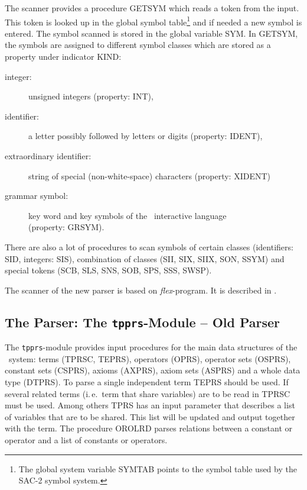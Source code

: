 The \redux scanner provides a procedure GETSYM which reads a token from
the input.
This token is looked up in the global symbol table\footnote{The global
system variable SYMTAB points to the symbol table used by the SAC-2 symbol 
system.} %
and if needed a new symbol is entered.
The symbol scanned is stored in the global variable SYM.
In GETSYM, the symbols are assigned to different symbol classes which 
are stored as a property under indicator KIND:
\begin{description}
 \item[integer:] unsigned integers (property: INT),
 \item[identifier:] a letter possibly followed by letters or digits
                    (property: IDENT),
 \item[extraordinary identifier:] string of special (non-white-space) 
                    characters (property: XIDENT)
 \item[grammar symbol:] key word and key symbols of the \redux\ interactive
                    language \\ (property: GRSYM).
\end{description}
There are also a lot of procedures to scan symbols of certain classes
(identifiers: SID, integers: SIS), combination of
classes  (SII, SIX, SIIX, SON, SSYM) and special tokens
(SCB, SLS, SNS, SOB, SPS, SSS, SWSP).

The scanner of the new parser is based on {\it flex}-program. 
It is described in \NPPG.

\subsection{The Parser: The {\tt tpprs}-Module -- Old Parser}

The {\tt tpprs}-module provides input procedures for the main data structures
of the \redux\ system:
terms (TPRSC, TEPRS), operators (OPRS), operator sets (OSPRS), constant sets
(CSPRS), axioms (AXPRS), axiom sets (ASPRS) and a  whole data type
(DTPRS).
To parse a single independent term TEPRS should be used.
If several related terms (i.\,e.\ term that share variables) are to be read in
TPRSC must be used.
Among others TPRS has an input parameter that describes a list
of variables that are to be shared.
This list will be updated and output together with the term.
The procedure OROLRD parses relations between a constant or
operator and a list of constants or operators.

